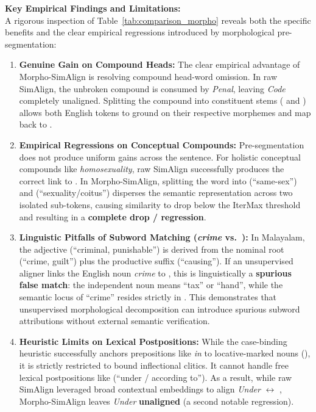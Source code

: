 \FloatBarrier

\noindent
\textbf{Key Empirical Findings and Limitations:}\\
A rigorous inspection of Table~\ref{tab:comparison_morpho} reveals both the specific benefits and the clear empirical regressions introduced by morphological pre-segmentation:
\begin{enumerate}[noitemsep]
    \item \textbf{Genuine Gain on Compound Heads:} The clear empirical advantage of Morpho-SimAlign is resolving compound head-word omission. In raw SimAlign, the unbroken compound  is consumed by \textit{Penal}, leaving \textit{Code} completely unaligned. Splitting the compound into constituent stems ( and ) allows both English tokens to ground on their respective morphemes and map back to .
    \item \textbf{Empirical Regressions on Conceptual Compounds:} Pre-segmentation does not produce uniform gains across the sentence. For holistic conceptual compounds like \textit{homosexuality}, raw SimAlign successfully produces the correct link to . In Morpho-SimAlign, splitting the word into  (``same-sex'') and  (``sexuality/coitus'') disperses the semantic representation across two isolated sub-tokens, causing similarity to drop below the IterMax threshold and resulting in a \textbf{complete drop / regression}.
    \item \textbf{Linguistic Pitfalls of Subword Matching (\textit{crime} vs.\ ):} In Malayalam, the adjective  (``criminal, punishable'') is derived from the nominal root  (``crime, guilt'') plus the productive suffix  (``causing''). If an unsupervised aligner links the English noun \textit{crime} to , this is linguistically a \textbf{spurious false match}: the independent noun  means ``tax'' or ``hand'', while the semantic locus of ``crime'' resides strictly in . This demonstrates that unsupervised morphological decomposition can introduce spurious subword attributions without external semantic verification.
    \item \textbf{Heuristic Limits on Lexical Postpositions:} While the case-binding heuristic successfully anchors prepositions like \textit{in} to locative-marked nouns (), it is strictly restricted to bound inflectional clitics. It cannot handle free lexical postpositions like  (``under / according to''). As a result, while raw SimAlign leveraged broad contextual embeddings to align \textit{Under} $\leftrightarrow$ , Morpho-SimAlign leaves \textit{Under} \textbf{unaligned} (a second notable regression).
\end{enumerate}